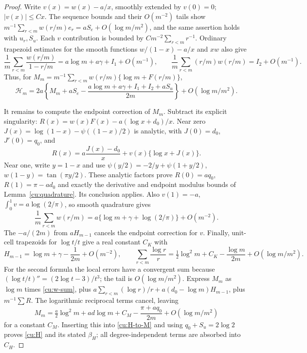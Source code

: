 \begin{proof}
Write $v(x)=w(x)-a/x$, smoothly extended by $v(0)=0$; $|v(x)|\leq Cx$.
The sequence bounds and their $O(m^{-2})$ tails show
$m^{-1}\sum_{r<m}w(r/m)e_r=aS_e+O(\log m/m^2)$,
and the same assertion holds with $u_r,S_u$. Each $v$ contribution is
bounded by $Cm^{-2}\sum_{r<m}r^{-1}$. Ordinary trapezoid estimates for
the smooth functions $w/(1-x)-a/x$ and $xw$ also give
\[
 \frac1m\sum_{r<m}\frac{w(r/m)}{1-r/m}
     =a\log m+a\gamma+I_1+O(m^{-1}),\qquad
 \frac1m\sum_{r<m}(r/m)w(r/m)=I_2+O(m^{-1}).
\]
Thus, for $M_m=m^{-1}\sum_{r<m}w(r/m)\{\log m+F(r/m)\}$,
\begin{equation}\label{cu:H-to-M}
 \mathcal H_m=2a\left\{M_m+aS_e-
    \frac{a\log m+a\gamma+I_1+I_2+aS_u}{2m}\right\}
                      +O(\log m/m^2).
\end{equation}

It remains to compute the endpoint correction of $M_m$. Subtract its
explicit singularity:
$R(x)=w(x)F(x)-a(\log x+d_0)/x$.
Near zero $J(x)=\log(1-x)-\psi((1-x)/2)$ is analytic, with
$J(0)=d_0$, $J'(0)=q_0$, and
\[
 R(x)=a\frac{J(x)-d_0}{x}+v(x)\{\log x+J(x)\}.
\]
Near one, write $y=1-x$ and use
$\psi(y/2)=-2/y+\psi(1+y/2)$, $w(1-y)=\tan(\pi y/2)$.
These analytic factors prove
$R(0)=aq_0$, $R(1)=\pi-ad_0$ and exactly the derivative and endpoint
modulus bounds of Lemma~\ref{cu:quadrature}. Its conclusion applies.
Also $v(1)=-a$, $\int_0^1v=a\log(2/\pi)$, so smooth quadrature gives
\begin{equation}\label{cu:w-sum}
 \frac1m\sum_{r<m}w(r/m)=a\{\log m+\gamma+\log(2/\pi)\}+O(m^{-2}).
\end{equation}
The $-a/(2m)$ from $aH_{m-1}$ cancels the endpoint correction for $v$.
Finally, unit-cell trapezoids for $\log t/t$ give a real constant $C_K$ with
\[
 H_{m-1}=\log m+\gamma-\frac1{2m}+O(m^{-2}),\qquad
 \sum_{r<m}\frac{\log r}{r}=\tfrac12\log^2m+C_K
                   -\frac{\log m}{2m}+O(\log m/m^2).
\]
For the second formula the local errors have a convergent sum because
$(\log t/t)''=(2\log t-3)/t^3$; the tail is $O(\log m/m^2)$.
Express $M_m$ as $\log m$ times \eqref{cu:w-sum}, plus
$a\sum_{r<m}(\log r)/r+a(d_0-\log m)H_{m-1}$, plus $m^{-1}\sum R$.
The logarithmic reciprocal terms cancel, leaving
\[
 M_m=\tfrac a2\log^2m+ad\log m+C_M
          -\frac{\pi+aq_0}{2m}+O(\log m/m^2)
\]
for a constant $C_M$. Inserting this into \eqref{cu:H-to-M} and using
$q_0+S_u=2\log2$ proves \eqref{cu:H} and its stated $\beta_H$;
all degree-independent terms are absorbed into $C_H$.


\end{proof}
